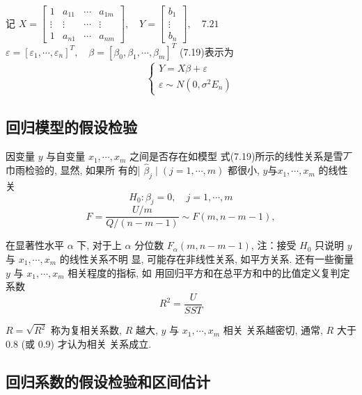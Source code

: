 记 \( X=\left[\begin{array}{cccc}1 & a_{11} & \cdots & a_{1 m} \\ \vdots & \vdots & \cdots & \vdots \\ 1 & a_{n 1} & \cdots & a_{n m}\end{array}\right], \quad Y=\left[\begin{array}{c}b_{1} \\ \vdots \\ b_{n}\end{array}\right], \quad {7 . 2 1} \)
\( \varepsilon=\left[\varepsilon_{1}, \cdots, \varepsilon_{n}\right]^{T}, \quad \beta=\left[\beta_{0}, \beta_{1}, \cdots, \beta_{m}\right]^{T} \)
(7.19)表示为
$$
\begin{array}{l}

\qquad\left\{\begin{array}{l}
{Y}={X} {\beta}+{\varepsilon} \\
{\varepsilon} \sim {N}\left({0}, \sigma^{2} {E}_{n}\right)
\end{array}\right.
\end{array}
$$

\subsection{回归模型的假设检验}

因变量 \( y \) 与自变量 \( x_{1}, \cdots, x_{m} \) 之间是否存在如模型 式(7.19)所示的线性关系是雪丆巾雨检验的, 显然, 如果所 有的| \( \hat{\beta}_{j} \mid(j=1, \cdots, m) \) 都很小, \( y 与 x_{1}, \cdots, x_{m} \) 的线性关
$$
H_{0}: \beta_{j}=0, \quad j=1, \cdots, m
$$
$$
F=\frac{U / m}{Q /(n-m-1)} \sim F(m, n-m-1),
$$

在显著性水平 \( \alpha \) 下, 对于上 \( \alpha \) 分位数 \( {F}_{\alpha}({m}, {n}-{m}-{1}) \),
注：接受 \( {H}_{0} \) 只说明 \( {y} \) 与 \( {x}_{1}, \cdots, {x}_{m} \) 的线性关系不明
显, 可能存在非线性关系, 如平方关系.  还有一些衡量 \( y \) 与 \( x_{1}, \cdots, x_{m} \) 相关程度的指标, 如 用回归平方和在总平方和中的比值定义复判定系数
$$
{R}^{2}=\frac{{U}}{{S S T}}
$$

\( {R}=\sqrt{{R}^{2}} \) 称为复相关系数, \( {R} \) 越大, \( {y} \) 与 \( {x}_{1}, \cdots, {x}_{m} \) 相关
关系越密切, 通常,  \( {R} \) 大于 \( 0.8 \) (或 0.9) 才认为相关
关系成立. 

\subsection{回归系数的假设检验和区间估计}

